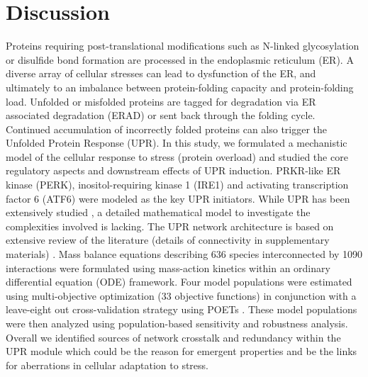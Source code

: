 \documentclass[fleqn,10pt]{wlscirep}
\begin{document}
\section*{Discussion}

Proteins requiring post-translational modifications such as N-linked glycosylation or disulfide bond formation are processed in the endoplasmic reticulum (ER).
A diverse array of cellular stresses can lead to dysfunction of the ER, and ultimately to an imbalance between protein-folding capacity and protein-folding load. Unfolded or misfolded proteins are tagged for degradation via ER associated degradation (ERAD) or sent back through the folding cycle. Continued accumulation of incorrectly folded proteins can also trigger the Unfolded Protein Response (UPR).
In this study, we formulated a mechanistic model of the cellular response to stress (protein overload) and studied the core regulatory aspects and downstream effects of UPR induction.
PRKR-like ER kinase (PERK), inositol-requiring kinase 1 (IRE1) and activating transcription factor 6 (ATF6) were modeled as the key UPR initiators. While UPR has been extensively studied \cite{naidoo2009er, ron2002translational, kaufman2002unfolded,ellgaard2003qce,Fonseca:2009fk,Schroder:2005vn,gotoh:hdc,mccullough2001gsc, belmont2008cga,Hetz:2009qc,Urano:2000uq,szegezdi2006mediators}, a detailed mathematical model to investigate the complexities involved is lacking.
The UPR network architecture is based on extensive review of the literature (details of connectivity in supplementary materials) \cite{naidoo2009er, ron2002translational, kaufman2002unfolded,ellgaard2003qce,Fonseca:2009fk,Schroder:2005vn,gotoh:hdc,mccullough2001gsc, belmont2008cga,Hetz:2009qc,Urano:2000uq,szegezdi2006mediators}.
Mass balance equations describing 636 species interconnected by 1090 interactions were formulated using mass-action kinetics within an ordinary differential equation (ODE) framework.
Four model populations were estimated using multi-objective optimization (33 objective functions) in conjunction with a leave-eight out cross-validation strategy using POETs \cite{Song:2010ij}.
These model populations were then analyzed using population-based sensitivity and robustness analysis.
Overall we identified sources of network crosstalk and redundancy within the UPR module which could be the reason for emergent properties and be the links for aberrations in cellular adaptation to stress.
\end{document}
